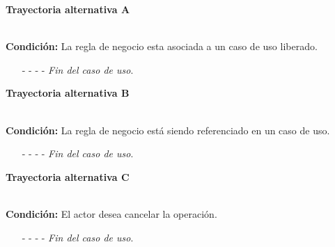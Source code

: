 \hypertarget{CU8-3:TAA}{\textbf{Trayectoria alternativa A}}\\
\noindent \textbf{Condición:} La regla de negocio esta asociada a un caso de uso liberado.
\begin{enumerate}
\UCpaso[\UCsist] Oculta el botón \eliminar de la regla de negocio que esta asociada a casos de uso liberados de la pantalla .
	\item[- -] - - {\em {Fin del caso de uso}}.%
\end{enumerate}
\hypertarget{CU8-3:TAB}{\textbf{Trayectoria alternativa B}}\\
\noindent \textbf{Condición:} La regla de negocio está siendo referenciado en un caso de uso.
\begin{enumerate}
	\UCpaso[\UCsist] Muestra el mensaje  en la pantalla  en una pantalla emergente con la lista de casos de uso que están referenciando a la entidad.
	\UCpaso[\UCactor] Oprime el botón  de la pantalla emergente.
	\UCpaso[\UCsist] Muestra la pantalla .
	\item[- -] - - {\em {Fin del caso de uso}}.%
\end{enumerate}
\hypertarget{CU8-3:TAC}{\textbf{Trayectoria alternativa C}}\\
\noindent \textbf{Condición:} El actor desea cancelar la operación.
\begin{enumerate}
	\UCpaso[\UCactor] Solicita cancelar la operación oprimiendo el botón  del mensaje emergente .
	\UCpaso[\UCsist] Muestra la pantalla .
	\item[- -] - - {\em {Fin del caso de uso}}.%
\end{enumerate}
	

